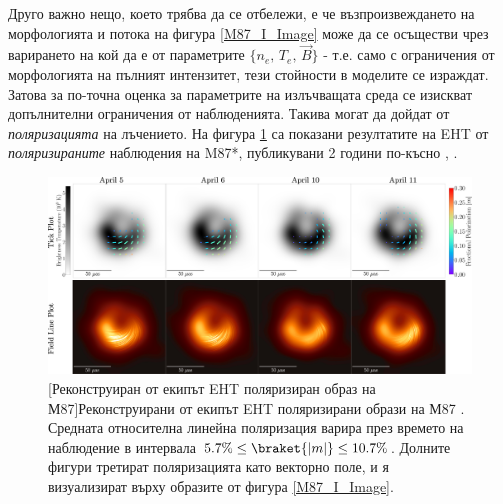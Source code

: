 Друго важно нещо, което трябва да се отбележи, е че възпроизвеждането на морфологията и потока на фигура \ref{M87_I_Image} може да се осъществи чрез варирането на кой да е от параметрите $\{n_{e},\,T_{e},\, \vec{B}\}$ \cite{EHT_M87_V} - т.е. само с ограничения от морфологията на пълният интензитет, тези стойности в моделите се израждат. Затова за по-точна оценка за параметрите на излъчващата среда се изискват допълнителни ограничения от наблюденията. Такива могат да дойдат от \emph{поляризацията} на лъчението. На фигура \ref{M87_Pol_Image} са показани резултатите на EHT от \emph{поляризираните} наблюдения на M87*, публикувани 2 години по-късно \cite{EHT_M87_VII}, \cite{EHT_M87_VIII}.\\

 \begin{figure}[h!]{
 \centering
 \includegraphics[scale = 0.8]{M87_Polarization_overlay.jpg}\newline
 [Реконструиран от екипът EHT поляризиран образ на М87]{\small Реконструирани от екипът EHT поляризирани образи на М87 \cite{EHT_M87_VII}. Средната относителна линейна поляризация варира през времето на наблюдение в интервала $5.7\% \le \braket{|m|} \le 10.7\%$. Долните фигури третират поляризацията като векторно поле, и я визуализират върху образите от фигура \ref{M87_I_Image}.} 
 \label{M87_Pol_Image}}
 \end{figure}
 
